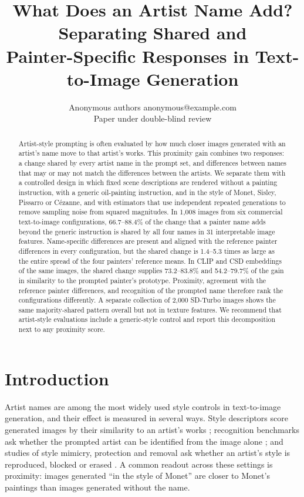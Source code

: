 \documentclass[10pt]{article}
\title{What Does an Artist Name Add? Separating Shared and\\Painter-Specific Responses in Text-to-Image Generation}
\author{\name Anonymous authors \email anonymous@example.com \\
      \addr Paper under double-blind review}
\begin{document}
\maketitle

\begin{abstract}
Artist-style prompting is often evaluated by how much closer images generated with
an artist's name move to that artist's works. This proximity gain combines two
responses: a change shared by every artist name in the prompt set, and differences
between names that may or may not match the differences between the artists. We
separate them with a controlled design in which fixed scene descriptions are
rendered without a painting instruction, with a generic oil-painting instruction,
and in the style of Monet, Sisley, Pissarro or C\'ezanne, and with estimators that
use independent repeated generations to remove sampling noise from squared
magnitudes. In 1,008 images from six commercial text-to-image configurations,
66.7--88.4\% of the change that a painter name adds beyond the generic instruction
is shared by all four names in 31 interpretable image features. Name-specific
differences are present and aligned with the reference painter differences in every
configuration, but the shared change is 1.4--5.3 times as large as the entire
spread of the four painters' reference means. In CLIP and CSD embeddings of the
same images, the shared change supplies 73.2--83.8\% and 54.2--79.7\% of the gain
in similarity to the prompted painter's prototype. Proximity, agreement with the
reference painter differences, and recognition of the prompted name therefore rank
the configurations differently. A separate collection of 2,000 SD-Turbo images
shows the same majority-shared pattern overall but not in texture features. We
recommend that artist-style evaluations include a generic-style control and report
this decomposition next to any proximity score.
\end{abstract}

\section{Introduction}\label{sec:intro}

Artist names are among the most widely used style controls in text-to-image
generation, and their effect is measured in several ways. Style descriptors score
generated images by their similarity to an artist's works
\citep{somepalli2024style}; recognition benchmarks ask whether the prompted artist
can be identified from the image alone \citep{su2025prompted,moayeri2025rethinking};
and studies of style mimicry, protection and removal ask whether an artist's style
is reproduced, blocked or erased
\citep{shan2023glaze,honig2025adversarial,gandikota2023erasing,zhang2024unlearncanvas}.
A common readout across these settings is proximity: images generated ``in the
style of Monet'' are closer to Monet's paintings than images generated without the
name.
\end{document}
